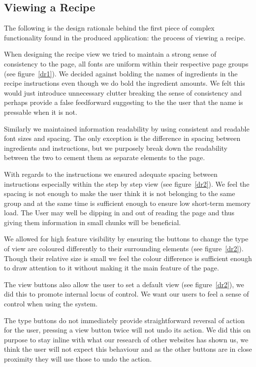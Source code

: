 \subsection{Viewing a Recipe}
The following is the design rationale behind the first piece of complex functionality found in the produced application: the process of viewing a recipe.

When designing the recipe view we tried to maintain a strong sense of consistency to the page, all fonts are uniform within their respective page groups (see figure~\ref{dr1}). We decided against bolding the names of ingredients in the recipe instructions even though we do bold the ingredient amounts. We felt this would just introduce unnecessary clutter breaking the sense of consistency and perhaps provide a false feedforward suggesting to the the user that the name is pressable when it is not.

Similarly we maintained information readability by using consistent and readable font sizes and spacing. The only exception is the difference in spacing between ingredients and instructions, but we purposely break down the readability between the two to cement them as separate elements to the page.

With regards to the instructions we ensured adequate spacing between instructions especially within the step by step view (see figure~\ref{dr2}). We feel the spacing is not enough to make the user think it is not belonging to the same group and at the same time is sufficient enough to ensure low short-term memory load. The User may well be dipping in and out of reading the page and thus giving them information in small chunks will be beneficial.

We allowed for high feature visibility by ensuring the buttons to change the type of view are coloured differently to their surrounding elements (see figure~\ref{dr2}). Though their relative size is small we feel the colour difference is sufficient enough to draw attention to it without making it the main feature of the page.

The view buttons also allow the user to set a default view (see figure~\ref{dr2}), we did this to promote internal locus of control. We want our users to feel a sense of control when using the system.

The type buttons do not immediately provide straightforward reversal of action for the user, pressing a view button twice will not undo its action. We did this on purpose to stay inline with what our research of other websites has shown us, we think the user will not expect this behaviour and as the other buttons are in close proximity they will use those to undo the action.

